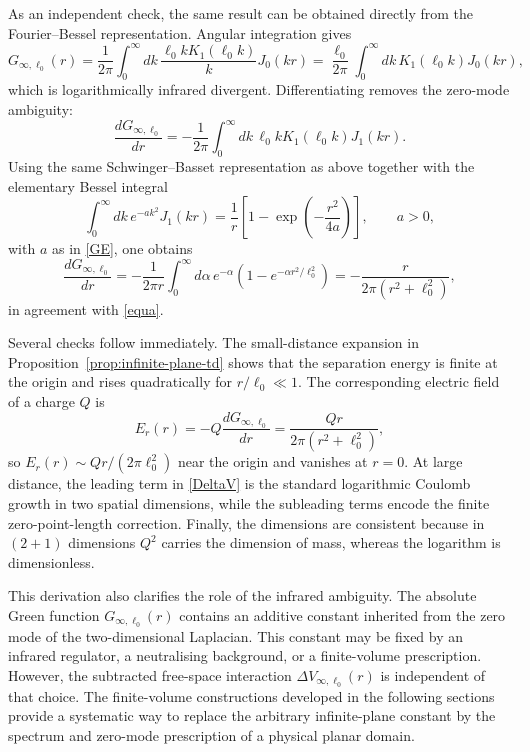 \documentclass[openacc]{rsproca_new}%
\begin{document}
As an independent check, the same result can be obtained directly from the Fourier--Bessel representation. Angular integration gives
\begin{equation}
  G_{\infty,\ell_0}(r)
  =\frac{1}{2\pi}\int_0^\infty dk\,\frac{\ell_0 kK_1(\ell_0 k)}{k}J_0(kr)
  =\frac{\ell_0}{2\pi}\int_0^\infty dk\,K_1(\ell_0 k)J_0(kr),
\end{equation}
which is logarithmically infrared divergent. Differentiating removes the zero-mode ambiguity:
\begin{equation}
  \frac{dG_{\infty,\ell_0}}{dr}
  =-\frac{1}{2\pi}\int_0^\infty dk\,\ell_0 kK_1(\ell_0 k)J_1(kr).
\end{equation}
Using the same Schwinger--Basset representation as above together with the elementary Bessel integral \cite{GradshteynRyzhik2014}
\begin{equation}
  \int_0^\infty dk\,e^{-ak^2}J_1(kr)
  =\frac{1}{r}\left[1-\exp\left(-\frac{r^2}{4a}\right)\right],
  \qquad a>0,
\end{equation}
with $a$ as in \eqref{GE}, one obtains
\begin{equation}
  \frac{dG_{\infty,\ell_0}}{dr}
  =-\frac{1}{2\pi r}\int_0^\infty d\alpha\,e^{-\alpha}
  \left(1-e^{-\alpha r^2/\ell_0^2}\right)
  =-\frac{r}{2\pi(r^2+\ell_0^2)},
\end{equation}
in agreement with \eqref{equa}.

Several checks follow immediately. The small-distance expansion in Proposition~\ref{prop:infinite-plane-td} shows that the separation energy is finite at the origin and rises quadratically for $r/\ell_0\ll 1$. The corresponding electric field of a charge $Q$ is
\begin{equation}
  E_r(r)=-Q\frac{dG_{\infty,\ell_0}}{dr}
  =\frac{Qr}{2\pi(r^2+\ell_0^2)},
\end{equation}
so $E_r(r)\sim Qr/(2\pi\ell_0^2)$ near the origin and vanishes at $r=0$. At large distance, the leading term in \eqref{DeltaV} is the standard logarithmic Coulomb growth in two spatial dimensions, while the subleading terms encode the finite zero-point-length correction. Finally, the dimensions are consistent because in $(2+1)$ dimensions $Q^2$ carries the dimension of mass, whereas the logarithm is dimensionless.

This derivation also clarifies the role of the infrared ambiguity. The absolute Green function $G_{\infty,\ell_0}(r)$ contains an additive constant inherited from the zero mode of the two-dimensional Laplacian. This constant may be fixed by an infrared regulator, a neutralising background, or a finite-volume prescription. However, the subtracted free-space interaction $\Delta V_{\infty,\ell_0}(r)$ is independent of that choice. The finite-volume constructions developed in the following sections provide a systematic way to replace the arbitrary infinite-plane constant by the spectrum and zero-mode prescription of a physical planar domain.
\end{document}
